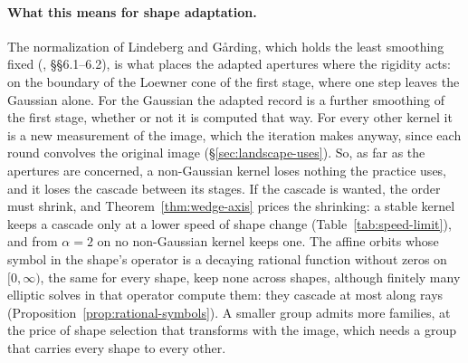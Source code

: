 \paragraph{What this means for shape adaptation.} The normalization of Lindeberg and G\aa{}rding,
which holds the least smoothing fixed (, \S\S6.1--6.2), is what places the
adapted apertures where the rigidity acts: on the boundary of the Loewner cone of the first stage,
where one step leaves the Gaussian alone. For the Gaussian the adapted record is a further smoothing
of the first stage, whether or not it is computed that way. For every other kernel it is a new
measurement of the image, which the iteration makes anyway, since each round convolves the original
image (\S\ref{sec:landscape-uses}). So, as far as the apertures are concerned, a non-Gaussian kernel
loses nothing the practice uses, and it loses the cascade between its stages. If the cascade is
wanted, the order must shrink, and Theorem~\ref{thm:wedge-axis} prices the shrinking: a stable kernel
keeps a cascade only at a lower speed of shape change (Table~\ref{tab:speed-limit}), and from
$\alpha = 2$ on no non-Gaussian kernel keeps one. The affine orbits whose symbol in the shape's operator is
a decaying rational function without zeros on $[0, \infty)$, the same for every shape, keep none
across shapes, although finitely many elliptic solves in that operator compute them: they cascade at most along rays
(Proposition~\ref{prop:rational-symbols}). A smaller group admits more families, at the price of
shape selection that transforms with the image, which needs a group that carries every shape to every
other.

